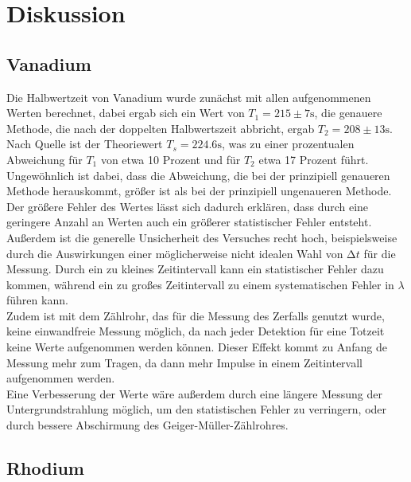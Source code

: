 \section{Diskussion}
\label{sec:Diskussion}

\subsection{Vanadium}

Die Halbwertzeit von Vanadium wurde zunächst mit allen aufgenommenen Werten berechnet, dabei ergab sich ein Wert
von $T_1 = 215 \pm 7 \si{\s}$, die genauere Methode, die nach der doppelten Halbwertszeit abbricht, ergab 
$T_2 = 208 \pm 13 \si{\s}$. Nach Quelle \cite{vanadium}
ist der Theoriewert $T_s = 224.6 \si{\s}$, was zu einer prozentualen Abweichung für $T_1$ von etwa 10 Prozent und für 
$T_2$ etwa 17 Prozent führt. Ungewöhnlich ist dabei, dass die Abweichung, die bei der prinzipiell genaueren Methode herauskommt,
größer ist als bei der prinzipiell ungenaueren Methode. 
Der größere Fehler des Wertes lässt sich dadurch erklären, dass durch eine geringere Anzahl an Werten auch ein größerer statistischer Fehler entsteht. 
Außerdem ist die generelle Unsicherheit des Versuches recht hoch, beispielsweise durch die Auswirkungen einer möglicherweise nicht idealen Wahl von $\increment t$
für die Messung. Durch ein zu kleines Zeitintervall kann ein statistischer Fehler dazu kommen, während ein zu großes Zeitintervall zu einem systematischen Fehler in 
$\lambda$ führen kann. \\
Zudem ist mit dem Zählrohr, das für die Messung des Zerfalls genutzt wurde, keine einwandfreie Messung möglich, da nach jeder Detektion für eine Totzeit keine Werte 
aufgenommen werden können. Dieser Effekt kommt zu Anfang de Messung mehr zum Tragen, da dann mehr Impulse in einem Zeitintervall aufgenommen werden.\\
Eine Verbesserung der Werte wäre außerdem durch eine längere Messung der Untergrundstrahlung möglich, um den statistischen Fehler zu verringern, oder durch bessere Abschirmung
des Geiger-Müller-Zählrohres.

\subsection{Rhodium}


